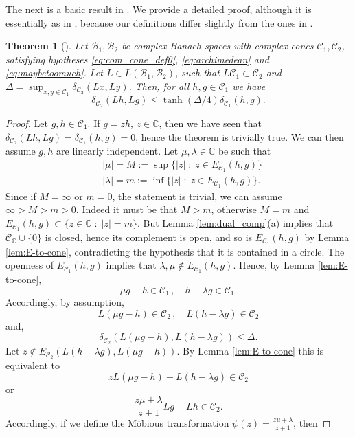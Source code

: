 \documentclass{amsart}
\numberwithin{equation}{section}
\newtheorem{thm}{Theorem}[section]
\newcommand\cB{{\mathcal B}}
\newcommand\cC{{\mathcal C}}
\newcommand\bC{{\mathbb C}}
\begin{document}
The next is a basic result in \cite{Du09}. We provide a detailed proof, although it is essentially as in \cite{Du09}, because our definitions differ slightly from the ones in \cite{Du09}.
\begin{thm}[{\cite[Theorem 3.1 (iii)]{Du11}}]\label{thm:complex_contraction}
Let $\cB_1,\cB_2$ be complex Banach spaces with complex cones $\cC_1,\cC_2$, satisfying hyotheses \eqref{eq:com_cone_def0}, \eqref{eq:archimedean} and \eqref{eq:maybetoomuch}. Let $L\in L(\cB_1,\cB_2)$, such that $L\cC_1\subset \cC_2$ and 
$\Delta=\sup_{x,y\in\cC_1}\delta_{\cC_2}(Lx,Ly)$. Then, for all $h,g\in\cC_1$ we have
\[
\delta_{\cC_2}(Lh,Lg)\leq \tanh(\Delta/4)\delta_{\cC_1}(h,g).
\]
\end{thm}

\begin{proof}
Let $g,h\in \cC_1$. If $g=z h$, $z\in\bC$, then we have seen that $\delta_{\cC_2}(Lh,Lg)=\delta_{\cC_1}(h,g)=0$, hence the theorem is trivially true. We can then assume $g,h$ are 
linearly independent. Let $\mu,\lambda\in \bC$ be such that 
\begin{equation}\label{eq:Mm_def}
\begin{split}
&|\mu|=M := \sup\{|z|\;:\; z\in E_{\cC_1}(h,g)\}\\
&|\lambda|=m := \inf\{|z|\;:\; z\in E_{\cC_1}(h,g)\}.
\end{split}
\end{equation}
 Since 
if $M =\infty$ or $m= 0$, the statement is trivial, we can assume $\infty >M > m>0$. 
Indeed it must be that $M>m$, otherwise $M=m$ and $E_{\cC_1}(h,g)\subset \{z\in \bC\;:\; |z|=m\}$. But Lemma \ref{lem:dual_comp}(a) implies that $\cC_\bC\cup\{0\}$ is closed, hence its complement is open, and so is $E_{\cC_1}(h,g)$ by Lemma \ref{lem:E-to-cone},
contradicting the hypothesis that it is contained in a circle.
The openness of $E_{\cC_1}(h,g)$ implies that
 $\lambda,\mu \not\in E_{\cC_1}(h,g)$. Hence, by Lemma \ref{lem:E-to-cone},
\[
\mu g-h\in \cC_1\, ,\quad h-\lambda g\in \cC_1.
\]
Accordingly,  by assumption,
\[
L(\mu g-h)\in \cC_2\,,\quad
L(h-\lambda g)\in \cC_2
\]
and,
\begin{equation}\label{eq:diam_hyp}
\delta_{\cC_2}(L(\mu g-h),L(h-\lambda g))\leq \Delta.
\end{equation}
Let $z\not\in E_{\cC_2}(L(h-\lambda g), L(\mu g-h))$. By Lemma \ref{lem:E-to-cone} this is equivalent to
\[
z L(\mu g-h)-L(h-\lambda g)\in \cC_2
\]
or
\[
\frac{z \mu+\lambda}{z +1}Lg-Lh\in \cC_2.
\]
Accordingly, if we define the Möbious transformation $\psi(z)=\frac{z \mu+\lambda}{z +1}$, then 

\end{proof}
\end{document}

